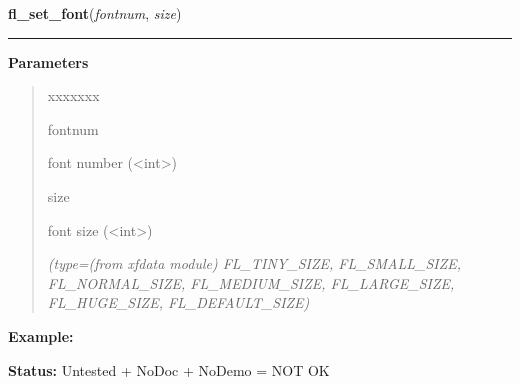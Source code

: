     \label{xformslib:library:fl_set_font}

    \vspace{0.5ex}

\hspace{.8\funcindent}\begin{boxedminipage}{\funcwidth}

    \raggedright \textbf{fl\_set\_font}(\textit{fontnum}, \textit{size})

    \vspace{-1.5ex}

    \rule{\textwidth}{0.5\fboxrule}
\setlength{\parskip}{2ex}
\setlength{\parskip}{1ex}
      \textbf{Parameters}
      \vspace{-1ex}

      \begin{quote}
        \begin{Ventry}{xxxxxxx}

          \item[fontnum]

          font number ({\textless}int{\textgreater})

          \item[size]

          font size ({\textless}int{\textgreater})

            {\it (type=(from xfdata module) FL\_TINY\_SIZE, FL\_SMALL\_SIZE, FL\_NORMAL\_SIZE, 
FL\_MEDIUM\_SIZE, FL\_LARGE\_SIZE, FL\_HUGE\_SIZE, FL\_DEFAULT\_SIZE)}

        \end{Ventry}

      \end{quote}

\textbf{Example:} 

\textbf{Status:} Untested + NoDoc + NoDemo = NOT OK



    \end{boxedminipage}

    \label{xformslib:library:fl_get_char_height}

    \vspace{0.5ex}

